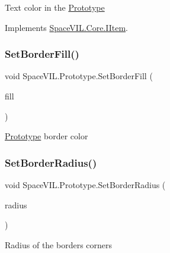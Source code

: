 Text color in the \mbox{\hyperlink{class_space_v_i_l_1_1_prototype}{Prototype}} 



Implements \mbox{\hyperlink{interface_space_v_i_l_1_1_core_1_1_i_item}{Space\+V\+I\+L.\+Core.\+I\+Item}}.

\mbox{\label{class_space_v_i_l_1_1_prototype_a85d92e82dcd890f026c72bb04dfa2dd3}} 
\subsubsection{\texorpdfstring{Set\+Border\+Fill()}{SetBorderFill()}}
{\footnotesize\ttfamily void Space\+V\+I\+L.\+Prototype.\+Set\+Border\+Fill (\begin{DoxyParamCaption}\item[{Color}]{fill }\end{DoxyParamCaption})\hspace{0.3cm}{\ttfamily [inline]}}



\mbox{\hyperlink{class_space_v_i_l_1_1_prototype}{Prototype}} border color 

\mbox{\label{class_space_v_i_l_1_1_prototype_a8d472c2323f8c6bbdb39fb238bb6cff4}} 
\subsubsection{\texorpdfstring{Set\+Border\+Radius()}{SetBorderRadius()}}
{\footnotesize\ttfamily void Space\+V\+I\+L.\+Prototype.\+Set\+Border\+Radius (\begin{DoxyParamCaption}\item[{\mbox{\hyperlink{class_space_v_i_l_1_1_decorations_1_1_corner_radius}{Corner\+Radius}}}]{radius }\end{DoxyParamCaption})\hspace{0.3cm}{\ttfamily [inline]}}



Radius of the border\textquotesingle{}s corners 

